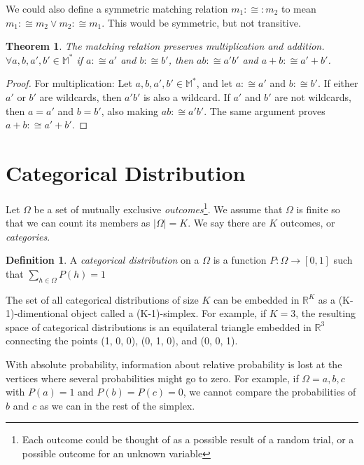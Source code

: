 \documentclass[twoside]{article}
\theoremstyle{plain}%
\newtheorem{theorem}{Theorem}[section]
\theoremstyle{definition}
\newtheorem{definition}{Definition}[section]
\theoremstyle{remark}
\begin{document}
We could also define a symmetric matching relation \(m_1 :\cong: m_2\) to mean \(m_1 :\cong m_2 \vee m_2 :\cong m_1\). This would be symmetric, but not transitive.

\begin{theorem}
\label{theorem:matching_multiplication}
The matching relation preserves multiplication and addition. \(\forall a,b,a',b' \in \mathbb{M^*}\) if \(a :\cong a'\) and \(b :\cong b'\), then \(ab :\cong a'b'\) and \(a+b :\cong a'+b'\).
\end{theorem}

\begin{proof}
For multiplication: Let \(a,b,a',b' \in \mathbb{M^*}\), and let \(a :\cong a'\) and \(b :\cong b'\). If either \(a'\) or \(b'\) are wildcards, then \(a'b'\) is also a wildcard. If \(a'\) and \(b'\) are not wildcards, then \(a = a'\) and \(b = b'\), also making \(ab :\cong a'b'\).
The same argument proves \(a+b :\cong a'+b'\).
\end{proof}

\section{Categorical Distribution}

Let \(\Omega\) be a set of mutually exclusive \textit{outcomes}\footnote{Each outcome could be thought of as a possible result of a random trial, or a possible outcome for an unknown variable}. We assume that \(\Omega\) is finite so that we can count its members as \(|\Omega| = K\). We say there are \(K\) outcomes, or \textit{categories}.

\begin{definition}
A \textit{categorical distribution} on a \(\Omega\) is a function \(P: \Omega \rightarrow [0, 1]\) such that \(\sum_{h \in \Omega} P(h) = 1\)
\end{definition}

The set of all categorical distributions of size \(K\) can be embedded in \(\mathbb{R}^K\) as a (K-1)-dimentional object called a (K-1)-simplex. For example, if \(K = 3\), the resulting space of categorical distributions is an equilateral triangle embedded in \(\mathbb{R}^3\) connecting the points (1, 0, 0), (0, 1, 0), and (0, 0, 1).

With absolute probability, information about relative probability is lost at the vertices where several probabilities might go to zero. For example, if \(\Omega = {a, b, c}\) with \(P(a) = 1\) and \(P(b) = P(c) = 0\), we cannot compare the probabilities of \(b\) and \(c\) as we can in the rest of the simplex.
\end{document}
